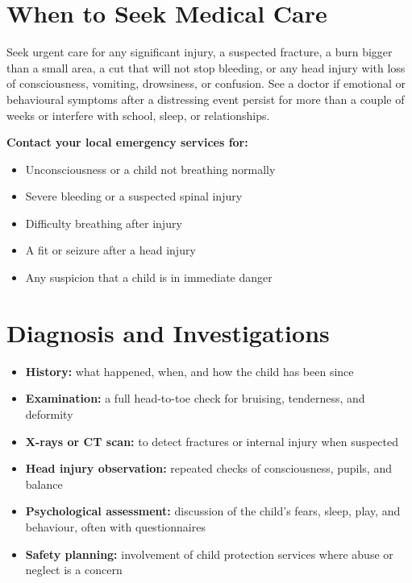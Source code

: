 \section*{When to Seek Medical Care}
Seek urgent care for any significant injury, a suspected fracture, a burn bigger than a small area, a cut that will not stop bleeding, or any head injury with loss of consciousness, vomiting, drowsiness, or confusion. See a doctor if emotional or behavioural symptoms after a distressing event persist for more than a couple of weeks or interfere with school, sleep, or relationships.

\textbf{Contact your local emergency services for:}
\begin{itemize}
    \item Unconsciousness or a child not breathing normally
    \item Severe bleeding or a suspected spinal injury
    \item Difficulty breathing after injury
    \item A fit or seizure after a head injury
    \item Any suspicion that a child is in immediate danger
\end{itemize}

\section*{Diagnosis and Investigations}
\begin{itemize}
    \item \textbf{History:} what happened, when, and how the child has been since
    \item \textbf{Examination:} a full head-to-toe check for bruising, tenderness, and deformity
    \item \textbf{X-rays or CT scan:} to detect fractures or internal injury when suspected
    \item \textbf{Head injury observation:} repeated checks of consciousness, pupils, and balance
    \item \textbf{Psychological assessment:} discussion of the child's fears, sleep, play, and behaviour, often with questionnaires
    \item \textbf{Safety planning:} involvement of child protection services where abuse or neglect is a concern
\end{itemize}

